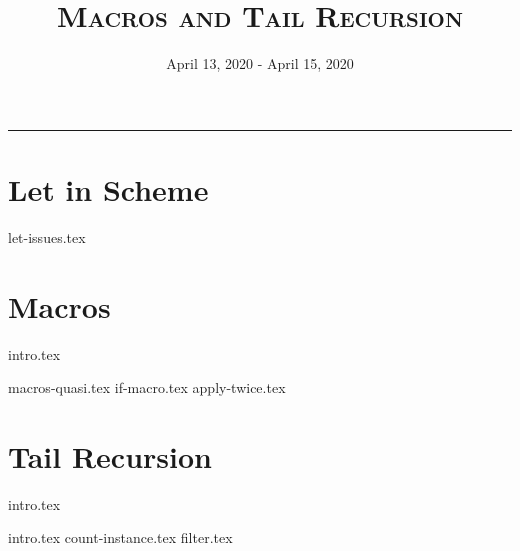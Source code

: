 \documentclass{exam}
\title{\textsc{Macros and Tail Recursion}}
\date{April 13, 2020 - April 15, 2020}
\begin{document}
\maketitle
\rule{\textwidth}{0.15em}
\fontsize{12}{15}\selectfont


\section{Let in Scheme}
\begin{questions}
{let-issues.tex}
\end{questions}

\newpage

\section{Macros}
{intro.tex}
\begin{questions}
{macros-quasi.tex}
{if-macro.tex}
{apply-twice.tex}
\end{questions}

\newpage
\section{Tail Recursion}
{intro.tex}
\begin{questions}
{intro.tex}
{count-instance.tex}
{filter.tex}
\end{questions}

\end{document}
